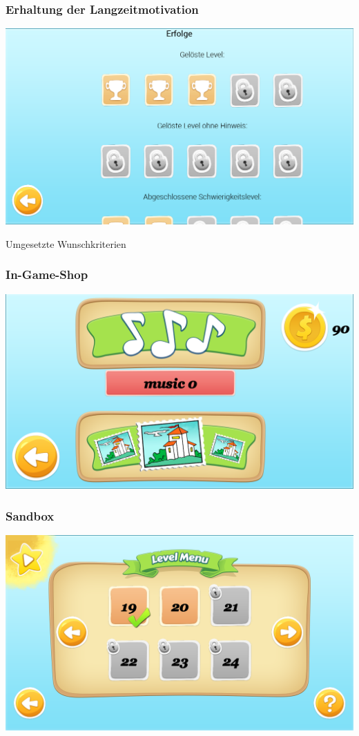 \documentclass[18pt]{beamer}
\begin{document}
\begin{frame}
	\frametitle{Erhaltung der Langzeitmotivation}
	\includegraphics[width=\textwidth]{pictures/achievementvs}
\end{frame}

\begin{frame}[c]
	\begin{center}
	\Huge
	Umgesetzte Wunschkriterien
	\end{center}
\end{frame}

\begin{frame}
	\frametitle{In-Game-Shop}
	\includegraphics[width=\textwidth]{pictures/shop}
\end{frame}

\begin{frame}
	\frametitle{Sandbox}
	\includegraphics[width=\textwidth]{pictures/levelselectionmenu}
\end{frame}
\end{document}
